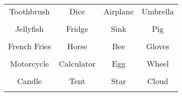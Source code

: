 \documentclass[12pt,a4paper]{article}
\begin{document}
\thispagestyle{empty}
\begin{table}[]
\centering
\Huge
\begin{tabular}{cccc}
 Toothbrush& Dice& Airplane& Umbrella\\  & & & \\
 Jellyfish& Fridge& Sink& Pig\\  & & & \\
 French Fries& Horse& Bee& Gloves\\  & & & \\
 Motorcycle& Calculator& Egg& Wheel\\  & & & \\
 Candle& Tent& Star& Cloud\\  & & & \\
\end{tabular}
\end{table}
\end{document}
